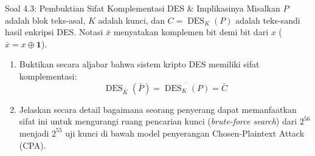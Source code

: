 \documentclass[11pt,a4paper]{article}
\begin{document}
\begin{soalbox}{Soal 4.3: Pembuktian Sifat Komplementasi DES \& Implikasinya}
Misalkan $P$ adalah blok teks-asal, $K$ adalah kunci, dan $C = \operatorname{DES}_K(P)$ adalah teks-sandi hasil enkripsi DES.
Notasi $\bar{x}$ menyatakan komplemen bit demi bit dari $x$ ($\bar{x} = x \oplus \mathbf{1}$).
\begin{enumerate}[label=(\alph*)]
    \item Buktikan secara aljabar bahwa sistem kripto DES memiliki sifat komplementasi:
    \[
    \operatorname{DES}_{\bar{K}}(\bar{P}) = \overline{\operatorname{DES}_K(P)} = \bar{C}
    \]
    \item Jelaskan secara detail bagaimana seorang penyerang dapat memanfaatkan sifat ini untuk mengurangi ruang pencarian kunci (\textit{brute-force search}) dari $2^{56}$ menjadi $2^{55}$ uji kunci di bawah model penyerangan Chosen-Plaintext Attack (CPA).
\end{enumerate}
\end{soalbox}
\end{document}
